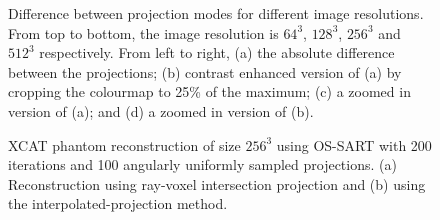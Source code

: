 \begin{figure}

\centering
{}
\caption[Difference between projection operations]{\label{fig:projtypesdiff} Difference between projection modes for different image resolutions. From top to bottom, the image resolution is $64^3$, $128^3$, $256^3$ and $512^3$ respectively. From left to right, (a) the absolute difference between the projections; (b) contrast enhanced version of (a) by cropping the colourmap to 25\% of the maximum; (c) a zoomed in version of (a); and (d) a zoomed in version of (b).} 
\end{figure}


\begin{figure}
\centering
{}

\caption[Reconstruction example using different projection operators]{\label{fig:OSSART200proj} XCAT phantom reconstruction of size $256^3$ using OS-SART with 200 iterations and 100 angularly uniformly sampled projections. (a) Reconstruction using ray-voxel intersection projection and (b) using the interpolated-projection method.} 
\end{figure}


